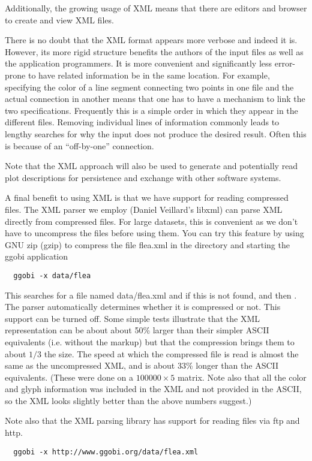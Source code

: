 \documentclass{article}
\def\directory#1{\dir{#1}}
\begin{document}
Additionally, the growing usage of XML means that there are editors
and browser to create and view XML files.

There is no doubt that the XML format appears more verbose and indeed
it is. However, its more rigid structure benefits the authors of the
input files as well as the application programmers.  It is more
convenient and significantly less error-prone to have related
information be in the same location.  For example, specifying the
color of a line segment connecting two points in one file and the
actual connection in another means that one has to have a mechanism to
link the two specifications. Frequently this is a simple order in
which they appear in the different files.  Removing individual lines
of information commonly leads to lengthy searches for why the input
does not produce the desired result.  Often this is because of an
``off-by-one'' connection.


Note that the XML approach will also be used to generate and
potentially read plot descriptions for persistence and exchange with
other software systems.


A final benefit to using XML is that we have support for reading
compressed files.  The XML parser we employ (Daniel Veillard's libxml)
can parse XML directly from compressed files.  For large datasets,
this is convenient as we don't have to uncompress the files before
using them.  You can try this feature by using GNU zip (gzip)
to compress the file flea.xml in the \directory{data}
directory and starting the ggobi application
\begin{verbatim}
  ggobi -x data/flea
\end{verbatim}
This searches for a file named data/flea.xml and if this is not found,
 and then .  The parser
automatically determines whether it is compressed or not.  This
support can be turned off.  Some simple tests illustrate that the XML
representation can be about about 50\% larger than their simpler ASCII
equivalents (i.e. without the markup) but that the compression brings
them to about $1/3$ the size. The speed at which the compressed file
is read is almost the same as the uncompressed XML, and is about 33\%
longer than the ASCII equivalents. (These were done on a $100000
\times 5$ matrix.  Note also that all the color and glyph information
was included in the XML and not provided in the ASCII, so the XML
looks slightly better than the above numbers suggest.)

Note also that the XML parsing library has support for reading files
via ftp and http.
\begin{verbatim}
  ggobi -x http://www.ggobi.org/data/flea.xml
\end{verbatim}
\end{document}
